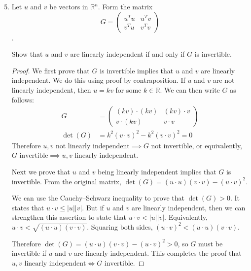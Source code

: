 \documentclass{article}
\newcommand{\Real}{\mathbb{R}}
\begin{document}
\begin{enumerate}

\setcounter{enumi}{4}
\item Let $u$ and $v$ be vectors in $\Real^n$. Form the matrix
\[ G = \left(
\begin{array}{cc}
u^T u & u^T v \\
v^T u & v^T v
\end{array}
\right) \].

Show that $u$ and $v$ are linearly independent if and only if $G$ is invertible.

\begin{proof}
We first prove that $G$ is invertible implies that $u$ and $v$ are linearly independent. We do this using proof by contraposition. If $u$ and $v$ are not linearly independent, then $u = kv$ for some $k \in \Real$. We can then write $G$ as follows:
\begin{align*}
G &= \left(
\begin{array}{cc}
(kv) \cdot (kv) & (kv) \cdot v \\
v \cdot (kv) & v \cdot v
\end{array}
\right) \\
\det(G) &= k^2 (v \cdot v)^2 - k^2 (v \cdot v)^2 = 0
\end{align*}
Therefore $u,v \mbox{ not linearly independent} \implies G \mbox{ not invertible}$, or equivalently, $G \mbox{ invertible} \implies u,v \mbox{ linearly independent}$.

Next we prove that $u$ and $v$ being linearly independent implies that $G$ is invertible. From the original matrix, $\det(G) = (u \cdot u) (v \cdot v) - (u \cdot v)^2$.

We can use the Cauchy--Schwarz inequality to prove that $\det(G) > 0$. It states that $u \cdot v \leq |u| |v|$. But if $u$ and $v$ are linearly independent, then we can strengthen this assertion to state that $u \cdot v < |u| |v|$. Equivalently, $u \cdot v < \sqrt{(u \cdot u)(v \cdot v)}$. Squaring both sides, $(u \cdot v)^2 < (u \cdot u)(v \cdot v)$.

Therefore $\det(G) = (u \cdot u) (v \cdot v) - (u \cdot v)^2 > 0$, so $G$ must be invertible if $u$ and $v$ are linearly independent. This completes the proof that $u,v \mbox{ linearly independent} \iff G \mbox{ invertible}$.
\end{proof}

\end{enumerate}
\end{document}
